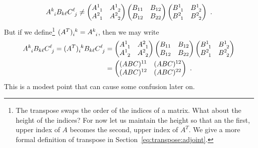 \documentclass[12pt]{article}
\begin{document}
\begin{bigidea}
\begin{align}
    A\aij{k}{i} B_{k\ell} C\aij{\ell}{j} \neq 
     \begin{pmatrix}
        A\aij{1}{1} & A\aij{1}{2} \\
        A\aij{2}{1} & A\aij{2}{2}
    \end{pmatrix} 
    \begin{pmatrix}
        B_{11} & B_{12} \\
        B_{12} & B_{22}
    \end{pmatrix}
    \begin{pmatrix}
        B\aij{1}{1} & B\aij{1}{2} \\
        B\aij{2}{1} & B\aij{2}{2}
    \end{pmatrix} \ .
\end{align}
But if we define\footnote{The transpose swaps the order of the indices of a matrix. What about the height of the indices? For now let us maintain the height so that an the first, upper index of $A$ becomes the second, upper index of $A^T$. We give a more formal definition of transpose in Section~\ref{eq:transpose:adjoint}.} $(A^T)_i^{\phantom{i}k} = A\aij{k}{i}$, then we may write
\begin{align}
    A\aij{k}{i} B_{k\ell} C\aij{\ell}{j} =
    (A^T)_i^{\phantom{i}k} B_{k\ell} C\aij{\ell}{j}&=
     \begin{pmatrix}
        A\aij{1}{1} &  A\aij{2}{1} \\
        A\aij{1}{2} & A\aij{2}{2}
    \end{pmatrix} 
    \begin{pmatrix}
        B_{11} & B_{12} \\
        B_{12} & B_{22}
    \end{pmatrix}
    \begin{pmatrix}
        B\aij{1}{1} & B\aij{1}{2} \\
        B\aij{2}{1} & B\aij{2}{2}
    \end{pmatrix} 
    \\ &=
    \begin{pmatrix}
        (ABC)^{11} & (ABC)^{12} \\
        (ABC)^{12} & (ABC)^{22}
    \end{pmatrix}
    \label{eq:ABC:matrix:multiplication:tensor:note}
    \ .
\end{align}
% 
This is a modest point that can cause some confusion later on. 
\end{bigidea} %
\end{document}
